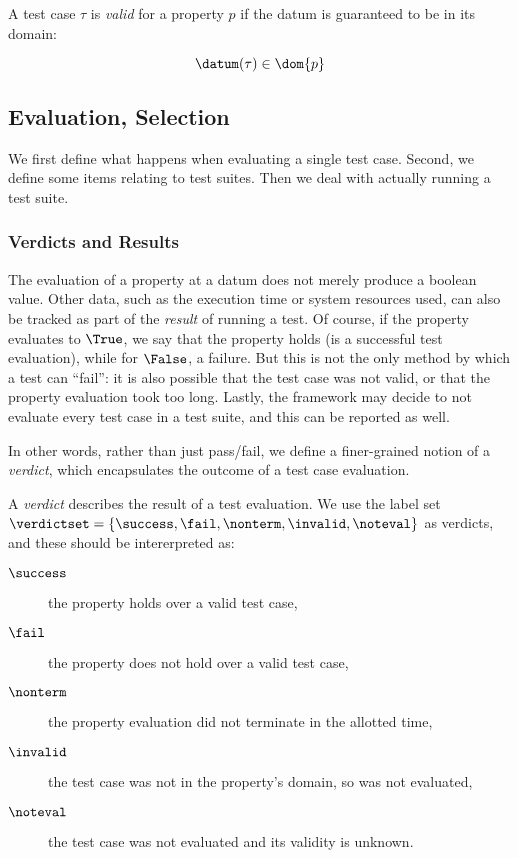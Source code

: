 \begin{df}
A test case $\tau$ is \emph{valid} for a 
property $p$ if the datum is guaranteed to be in its domain:

$$ \datum(\tau) \in \dom{p} $$
\end{df}

\subsection{Evaluation, Selection}

We first define what happens when evaluating a single test case.
Second, we define some items relating to test suites.
Then we deal with actually running a test suite.

\subsubsection{Verdicts and Results}

The evaluation of a property at a datum does not merely produce a boolean 
value.  Other data, such as the execution time or system resources used,
can also be tracked as part of the \emph{result} of running a test.
Of course, if the property evaluates to $\True$, we say that the 
property holds (is a successful test evaluation), while for $\False$,
a failure.  But this is not the only method by which a test can ``fail'':
it is also possible that the test case was not valid, or that the 
property evaluation took too long.  Lastly, the framework may decide to
not evaluate every test case in a test suite, and this can be reported as well.

In other words, rather than just pass/fail, we define a finer-grained notion
of a \emph{verdict}, which encapsulates the outcome of a test case evaluation.

\begin{df}[Verdict]
A \emph{verdict} describes the result of a test evaluation.  We use the label
set $\verdictset = \{ \success, \fail, \nonterm, \invalid, \noteval \}$
as verdicts, and these should be intererpreted as:

\begin{description}
\item[$\success$] the property holds over a valid test case,
\item[$\fail$] the property does not hold over a valid test case,
\item[$\nonterm$] the property evaluation did not terminate in the allotted time,
\item[$\invalid$] the test case was not in the property's domain, so was not evaluated,
\item[$\noteval$] the test case was not evaluated and its validity is unknown.
\end{description}
\end{df}

